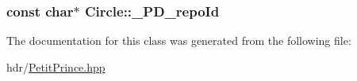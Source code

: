 \subsubsection[{\texorpdfstring{\+\_\+\+P\+D\+\_\+repo\+Id}{_PD_repoId}}]{ const char$\ast$ Circle\+::\+\_\+\+P\+D\+\_\+repo\+Id\hspace{0.3cm}{\ttfamily [static]}}\hypertarget{class_circle_a3cc85c810268073e3c3f0519aa3b12a0}{}\label{class_circle_a3cc85c810268073e3c3f0519aa3b12a0}


The documentation for this class was generated from the following file\+:\begin{DoxyCompactItemize}
\item 
hdr/\hyperlink{_petit_prince_8hpp}{Petit\+Prince.\+hpp}\end{DoxyCompactItemize}
